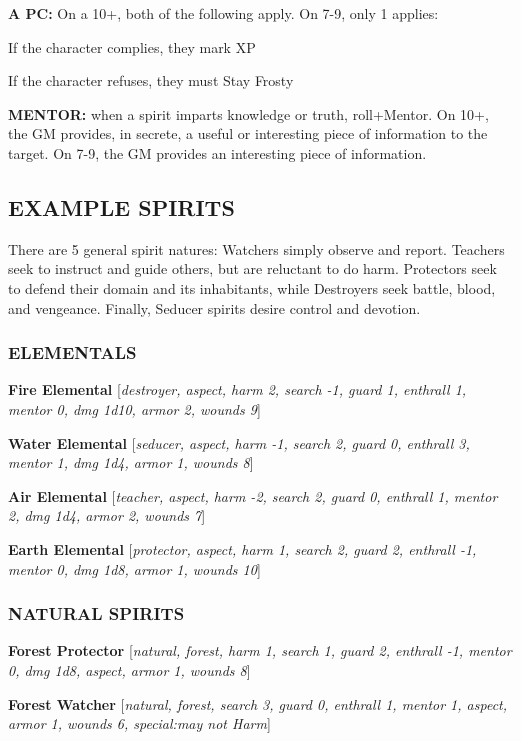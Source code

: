 \documentclass[oneside,10pt]{article}
\begin{document}
\begin{multicols}{2}
\begin{dent}
\textbf{A PC:} On a 10+, both of the following apply. On 7-9,
only 1 applies:
\begin{dent}
\tcirc{} If the character complies, they mark XP

\tcirc{} If the character refuses, they must Stay Frosty
\end{dent}
\end{dent}

\textbf{MENTOR:} when a spirit imparts knowledge or truth, roll+Mentor. On 10+, the GM provides, in secrete, a useful or
interesting piece of information to the target. On 7-9, the GM
provides an interesting piece of information.

\subsection{EXAMPLE SPIRITS}
There are 5 general spirit natures: Watchers simply observe
and report. Teachers seek to instruct and guide others, but
are reluctant to do harm. Protectors seek to defend their domain and its inhabitants, while Destroyers seek battle, blood,
and vengeance. Finally, Seducer spirits desire control and
devotion.

\subsubsection{ELEMENTALS}
\textbf{Fire Elemental} [\textit{destroyer, aspect, harm 2, search -1, guard
1, enthrall 1, mentor 0, dmg 1d10, armor 2, wounds
9}]

\textbf{Water Elemental} [\textit{seducer, aspect, harm -1, search 2, guard
0, enthrall 3, mentor 1, dmg 1d4, armor 1, wounds
8}]

\textbf{Air Elemental} [\textit{teacher, aspect, harm -2, search 2, guard 0,
enthrall 1, mentor 2, dmg 1d4, armor 2, wounds 7}]

\textbf{Earth Elemental} [\textit{protector, aspect, harm 1, search 2, guard
2, enthrall -1, mentor 0, dmg 1d8, armor 1, wounds
10}]

\subsubsection{NATURAL SPIRITS}
\textbf{Forest Protector} [\textit{natural, forest, harm 1, search 1, guard 2,
enthrall -1, mentor 0, dmg 1d8, aspect, armor 1,
wounds 8}]

\textbf{Forest Watcher} [\textit{natural, forest, search 3, guard 0, enthrall
1, mentor 1, aspect, armor 1, wounds 6, special:may not
Harm}]


\end{multicols}
\end{document}
